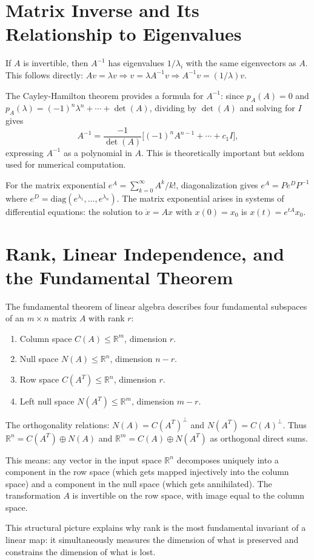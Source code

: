 \documentclass[11pt]{article}
\begin{document}
\section*{Matrix Inverse and Its Relationship to Eigenvalues}

If $A$ is invertible, then $A^{-1}$ has eigenvalues $1/\lambda_i$ with the same eigenvectors as $A$. This follows directly: $Av = \lambda v \Rightarrow v = \lambda A^{-1} v \Rightarrow A^{-1} v = (1/\lambda) v$.

The Cayley-Hamilton theorem provides a formula for $A^{-1}$: since $p_A(A) = 0$ and $p_A(\lambda) = (-1)^n \lambda^n + \cdots + \det(A)$, dividing by $\det(A)$ and solving for $I$ gives
\[
A^{-1} = \frac{-1}{\det(A)} \bigl[(-1)^n A^{n-1} + \cdots + c_1 I\bigr],
\]
expressing $A^{-1}$ as a polynomial in $A$. This is theoretically important but seldom used for numerical computation.

For the matrix exponential $e^A = \sum_{k=0}^\infty A^k / k!$, diagonalization gives $e^A = P e^D P^{-1}$ where $e^D = \text{diag}(e^{\lambda_1}, \ldots, e^{\lambda_n})$. The matrix exponential arises in systems of differential equations: the solution to $\dot{x} = Ax$ with $x(0) = x_0$ is $x(t) = e^{tA} x_0$.

\section*{Rank, Linear Independence, and the Fundamental Theorem}

The fundamental theorem of linear algebra describes four fundamental subspaces of an $m \times n$ matrix $A$ with rank $r$:
\begin{enumerate}
  \item Column space $C(A) \leq \mathbb{R}^m$, dimension $r$.
  \item Null space $N(A) \leq \mathbb{R}^n$, dimension $n - r$.
  \item Row space $C(A^T) \leq \mathbb{R}^n$, dimension $r$.
  \item Left null space $N(A^T) \leq \mathbb{R}^m$, dimension $m - r$.
\end{enumerate}

The orthogonality relations: $N(A) = C(A^T)^\perp$ and $N(A^T) = C(A)^\perp$. Thus $\mathbb{R}^n = C(A^T) \oplus N(A)$ and $\mathbb{R}^m = C(A) \oplus N(A^T)$ as orthogonal direct sums.

This means: any vector in the input space $\mathbb{R}^n$ decomposes uniquely into a component in the row space (which gets mapped injectively into the column space) and a component in the null space (which gets annihilated). The transformation $A$ is invertible on the row space, with image equal to the column space.

This structural picture explains why rank is the most fundamental invariant of a linear map: it simultaneously measures the dimension of what is preserved and constrains the dimension of what is lost.
\end{document}
